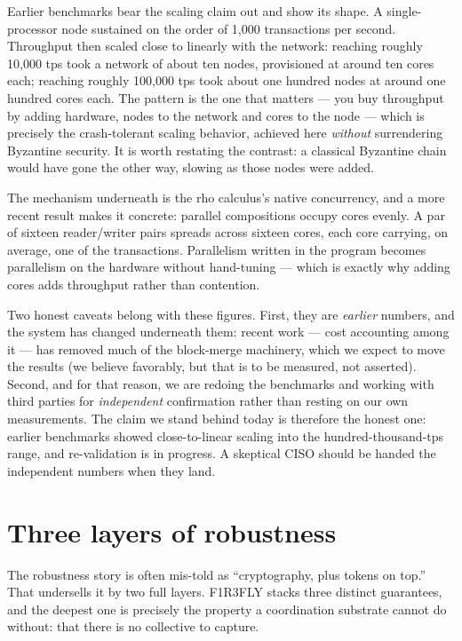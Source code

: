 \documentclass[11pt]{article}
\begin{document}
Earlier benchmarks bear the scaling claim out and show its shape. A single-processor node sustained on the order of 1{,}000 transactions per second. Throughput then scaled close to linearly with the network: reaching roughly 10{,}000 tps took a network of about ten nodes, provisioned at around ten cores each; reaching roughly 100{,}000 tps took about one hundred nodes at around one hundred cores each. The pattern is the one that matters --- you buy throughput by adding hardware, nodes to the network and cores to the node --- which is precisely the crash-tolerant scaling behavior, achieved here \emph{without} surrendering Byzantine security. It is worth restating the contrast: a classical Byzantine chain would have gone the other way, slowing as those nodes were added.

The mechanism underneath is the rho calculus's native concurrency, and a more recent result makes it concrete: parallel compositions occupy cores evenly. A par of sixteen reader/writer pairs spreads across sixteen cores, each core carrying, on average, one of the transactions. Parallelism written in the program becomes parallelism on the hardware without hand-tuning --- which is exactly why adding cores adds throughput rather than contention.

Two honest caveats belong with these figures. First, they are \emph{earlier} numbers, and the system has changed underneath them: recent work --- cost accounting among it --- has removed much of the block-merge machinery, which we expect to move the results (we believe favorably, but that is to be measured, not asserted). Second, and for that reason, we are redoing the benchmarks and working with third parties for \emph{independent} confirmation rather than resting on our own measurements. The claim we stand behind today is therefore the honest one: earlier benchmarks showed close-to-linear scaling into the hundred-thousand-tps range, and re-validation is in progress. A skeptical CISO should be handed the independent numbers when they land.

\section{Three layers of robustness}\label{sec:layers}

The robustness story is often mis-told as ``cryptography, plus tokens on top.'' That undersells it by two full layers. F1R3FLY stacks three distinct guarantees, and the deepest one is precisely the property a coordination substrate cannot do without: that there is no collective to capture.
\end{document}
